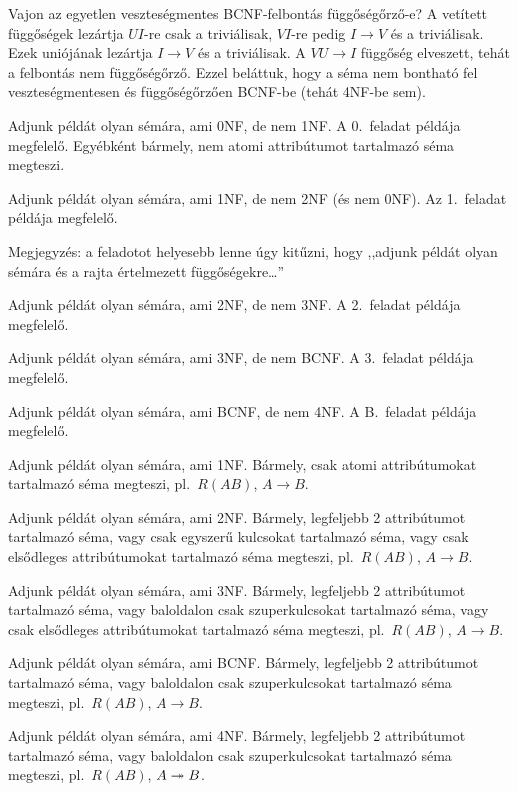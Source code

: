 \documentclass{article}
\begin{document}
Vajon az egyetlen veszteségmentes BCNF-felbontás függőségőrző-e? A vetített
függőségek lezártja $UI$-re csak a triviálisak, $VI$-re pedig $I\to V$ és a
triviálisak. Ezek uniójának lezártja $I\to V$ és a triviálisak. A $VU\to I$
függőség elveszett, tehát a felbontás nem függőségőrző. Ezzel beláttuk, hogy
a séma nem bontható fel veszteségmentesen és függőségőrzően BCNF-be (tehát
4NF-be sem).

Adjunk példát olyan sémára, ami 0NF, de nem 1NF.
\megoldas A 0.\ feladat példája megfelelő. Egyébként bármely, nem atomi
attribútumot tartalmazó séma megteszi.


Adjunk példát olyan sémára, ami 1NF, de nem 2NF (és nem 0NF).
\megoldas Az 1.\ feladat példája megfelelő.

Megjegyzés: a feladotot helyesebb lenne úgy kitűzni, hogy ,,adjunk példát
olyan sémára és a rajta értelmezett függőségekre\ldots''


Adjunk példát olyan sémára, ami 2NF, de nem 3NF.
\megoldas A 2.\ feladat példája megfelelő.

Adjunk példát olyan sémára, ami 3NF, de nem BCNF.
\megoldas A 3.\ feladat példája megfelelő.

Adjunk példát olyan sémára, ami BCNF, de nem 4NF.
\megoldas A B.\ feladat példája megfelelő.

Adjunk példát olyan sémára, ami 1NF.
\megoldas
Bármely, csak atomi attribútumokat tartalmazó séma megteszi, pl.\ $R(AB)$,
$A\to B$.

Adjunk példát olyan sémára, ami 2NF.
\megoldas Bármely, legfeljebb 2 attribútumot tartalmazó séma, vagy csak
egyszerű kulcsokat tartalmazó séma, vagy csak elsődleges attribútumokat
tartalmazó séma megteszi, pl.\ $R(AB)$, $A\to B$.

Adjunk példát olyan sémára, ami 3NF.
\megoldas Bármely, legfeljebb 2 attribútumot tartalmazó séma, vagy
baloldalon csak szuperkulcsokat tartalmazó séma, vagy csak elsődleges
attribútumokat tartalmazó séma megteszi, pl.\ $R(AB)$, $A\to B$.

Adjunk példát olyan sémára, ami BCNF.
\megoldas Bármely, legfeljebb 2 attribútumot tartalmazó séma, vagy
baloldalon csak szuperkulcsokat tartalmazó séma megteszi,
pl.\ $R(AB)$, $A\to B$.

Adjunk példát olyan sémára, ami 4NF.
\megoldas Bármely, legfeljebb 2 attribútumot tartalmazó séma, vagy
baloldalon csak szuperkulcsokat tartalmazó séma megteszi,
pl.\ $R(AB)$, $A\twoheadrightarrow B$.
\end{document}
